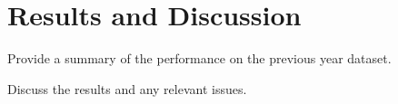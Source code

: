 \section{Results and Discussion}
\label{sec:results}

Provide a summary of the performance on the previous year dataset.

Discuss the results and any relevant issues.